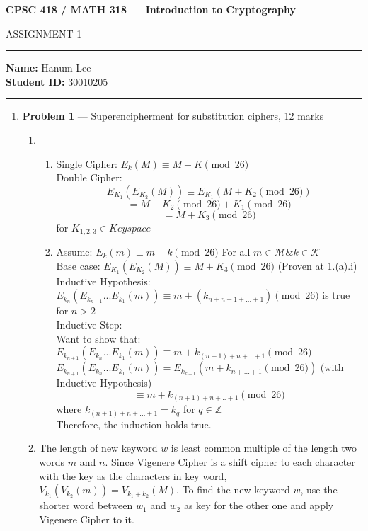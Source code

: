 \documentclass[11pt]{article}
\theoremstyle{definition}
\begin{document}
	\begin{center}
		{\bf \Large CPSC 418 / MATH 318 --- Introduction to Cryptography
		
		ASSIGNMENT 1 %
		}
	\end{center}
	
	\hrule 	
	
	\textbf{Name:} Hanum Lee  \\
	\textbf{Student ID:} 30010205\ 
	
	\medskip \hrule
	
	\begin{enumerate}
	
		\item[] \textbf{Problem 1} --- Superencipherment for substitution ciphers, 12 marks
	
	\begin{enumerate}
		\item
		\begin{enumerate}
			\item Single Cipher: $E_{k}(M) \equiv M + K \pmod{26}$\\
				Double Cipher:\\
				\[E_{K_{1}}(E_{K_{2}}(M)) \equiv E_{K_{1}}(M+K_{2}\pmod{26})\]
				\[= M + K_{2}\pmod{26} + K_{1}\pmod{26}\]
				\[= M + K_{3}\pmod{26}\]
				for $K_{1,2,3} \in Keyspace$
			\item Assume: $E_{k}(m) \equiv m + k\pmod{26}$ For all $m \in \mathcal{M} \& k \in \mathcal{K}$\\
			Base case: $E_{K_{1}}(E_{K_{2}}(M)) \equiv  M + K_{3}\pmod{26}$ (Proven at 1.(a).i)\\
			Inductive Hypothesis: $E_{k_{n}}(E_{k_{n-1}}...E_{k_{1}}(m)) \equiv m + (k_{n+n-1+...+1} ) \pmod{26}$ is true for $n > 2 $\\
			Inductive Step:\\
			Want to show that: $E_{k_{n+1}}(E_{k_{n}}...E_{k_{1}}(m)) \equiv m + k_{(n+1)+n+..+1} \pmod{26}$\\
			$E_{k_{n+1}}(E_{k_{n}}...E_{k_{1}}(m)) = E_{k_{k+1}}(m+k_{n+...+1}\pmod{26})$ (with Inductive Hypothesis)
			\[\equiv m + k_{(n+1) + n + .. +1} \pmod{26} \] where $k_{(n+1) + n+...+1} = k_q$ for $q \in \mathbb{Z} $\\
			Therefore, the induction holds true.
		\end{enumerate}
		\item
		The length of new keyword $w$ is least common multiple of the length two words $m$ and $n$. Since Vigenere Cipher is a shift cipher to each character with the key as the characters in key word, $V_{k_{1}}(V_{k_{2}}(m)) = V_{k_{1} + k_{2}}(M)$.
		To find the new keyword $w$, use the shorter word between $w_{1}$ and $w_{2}$ as key for the other one and apply Vigenere Cipher to it.
	\end{enumerate}
	

\end{enumerate}
\end{document}
